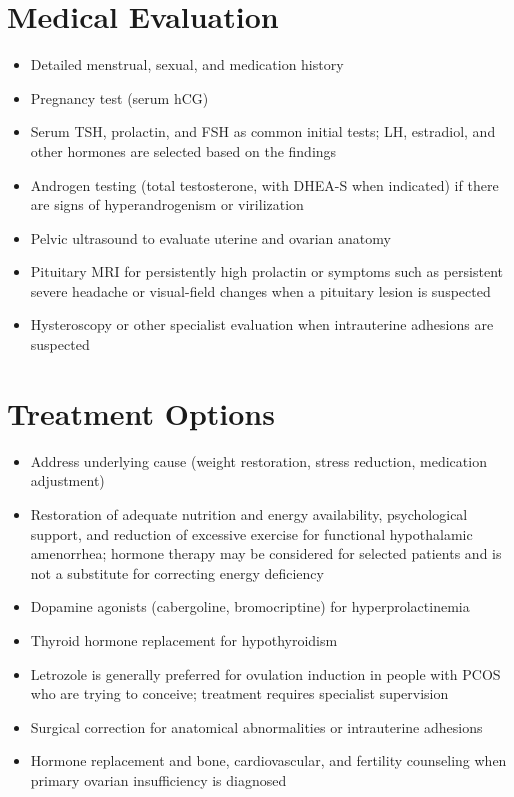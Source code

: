 \section*{Medical Evaluation}
\begin{itemize}
\item Detailed menstrual, sexual, and medication history
\item Pregnancy test (serum hCG)
\item Serum TSH, prolactin, and FSH as common initial tests; LH, estradiol, and other hormones are selected based on the findings
\item Androgen testing (total testosterone, with DHEA-S when indicated) if there are signs of hyperandrogenism or virilization
\item Pelvic ultrasound to evaluate uterine and ovarian anatomy
\item Pituitary MRI for persistently high prolactin or symptoms such as persistent severe headache or visual-field changes when a pituitary lesion is suspected
\item Hysteroscopy or other specialist evaluation when intrauterine adhesions are suspected
\end{itemize}

\section*{Treatment Options}
\begin{itemize}
\item Address underlying cause (weight restoration, stress reduction, medication adjustment)
\item Restoration of adequate nutrition and energy availability, psychological support, and reduction of excessive exercise for functional hypothalamic amenorrhea; hormone therapy may be considered for selected patients and is not a substitute for correcting energy deficiency
\item Dopamine agonists (cabergoline, bromocriptine) for hyperprolactinemia
\item Thyroid hormone replacement for hypothyroidism
\item Letrozole is generally preferred for ovulation induction in people with PCOS who are trying to conceive; treatment requires specialist supervision
\item Surgical correction for anatomical abnormalities or intrauterine adhesions
\item Hormone replacement and bone, cardiovascular, and fertility counseling when primary ovarian insufficiency is diagnosed
\end{itemize}

